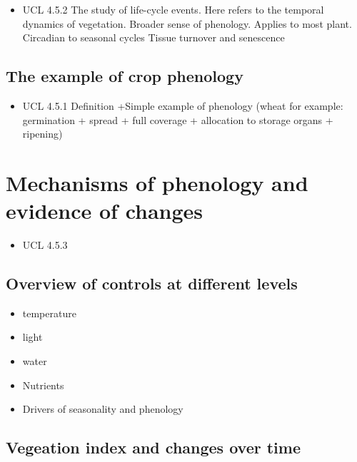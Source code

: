 \documentclass[
  oneside]{book}
\providecommand{\tightlist}{%
  \setlength{\itemsep}{0pt}\setlength{\parskip}{0pt}}
\begin{document}
\begin{itemize}
\tightlist
\item
  UCL 4.5.2
  The study of life-cycle events. Here refers to the temporal dynamics of vegetation.
  Broader sense of phenology.
  Applies to most plant. Circadian to seasonal cycles
  Tissue turnover and senescence
\end{itemize}

\hypertarget{the-example-of-crop-phenology}{%
\subsection{The example of crop phenology}\label{the-example-of-crop-phenology}}

\begin{itemize}
\tightlist
\item
  UCL 4.5.1
  Definition +Simple example of phenology (wheat for example: germination + spread + full coverage + allocation to storage organs + ripening)
\end{itemize}

\hypertarget{mechanisms-of-phenology-and-evidence-of-changes}{%
\section{Mechanisms of phenology and evidence of changes}\label{mechanisms-of-phenology-and-evidence-of-changes}}

\begin{itemize}
\tightlist
\item
  UCL 4.5.3
\end{itemize}

\hypertarget{overview-of-controls-at-different-levels}{%
\subsection{Overview of controls at different levels}\label{overview-of-controls-at-different-levels}}

\begin{itemize}
\tightlist
\item
  temperature
\item
  light
\item
  water
\item
  Nutrients
\item
  Drivers of seasonality and phenology
\end{itemize}

\hypertarget{vegeation-index-and-changes-over-time}{%
\subsection{Vegeation index and changes over time}\label{vegeation-index-and-changes-over-time}}
\end{document}
